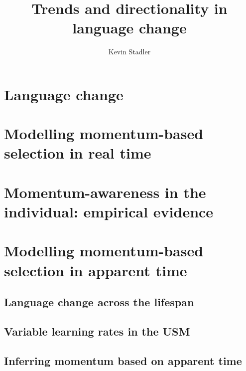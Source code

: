 \documentclass[oneside]{book}
\author{Kevin Stadler}
\title{Trends and directionality in language change}
\begin{document}
\maketitle


\tableofcontents



\chapter{Language change}
\label{ch:review}


\chapter[Momentum-based selection in real time]{Modelling momentum-based selection in real time}
\label{ch:model1}


\chapter[Momentum-awareness in the individual]{Momentum-awareness in the individual: empirical evidence}
\label{ch:questionnaire}


\chapter[Momentum-based selection in apparent time]{Modelling momentum-based selection in apparent time}
\section{Language change across the lifespan}
\section{Variable learning rates in the USM}
\section{Inferring momentum based on apparent time}
\end{document}
